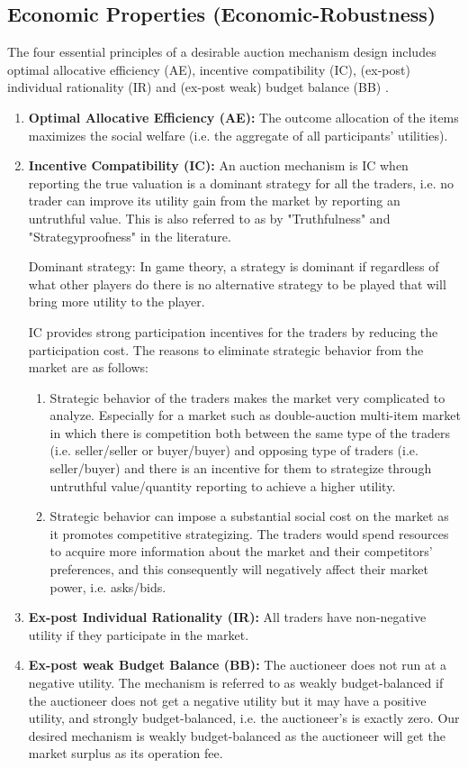 \subsection {Economic Properties (Economic-Robustness)}
\label{Method:subsec:Economic-Robustness}
The four essential principles of a desirable auction mechanism design includes optimal allocative efficiency (AE), incentive compatibility (IC), (ex-post) individual rationality (IR) and (ex-post weak) budget balance (BB) \cite{Krishna02}.

\begin{enumerate}
\item \textbf{Optimal Allocative Efficiency (AE):} The outcome allocation of the items maximizes the social welfare (i.e. the aggregate of all participants' utilities).
\item \textbf{Incentive Compatibility (IC):} An auction mechanism is IC when reporting the true valuation is a dominant strategy for all the traders, i.e. no trader can improve its utility gain from the market by reporting an untruthful value. This is also referred to as by "Truthfulness" and "Strategyproofness" in the literature.
\begin{Definition}
Dominant strategy: In game theory, a strategy is dominant if regardless of what other players do there is no alternative strategy to be played that will bring more utility to the player.
\end{Definition}
IC provides strong participation incentives for the traders by reducing the participation cost. The reasons to eliminate strategic behavior from the market are as follows:
\begin{enumerate}
\item Strategic behavior of the traders makes the market very complicated to analyze. Especially for a market such as double-auction multi-item market in which there is competition both between the same type of the traders (i.e. seller/seller or buyer/buyer) and opposing type of traders (i.e. seller/buyer) and there is an incentive for them to strategize through untruthful value/quantity reporting to achieve a higher utility.

\item Strategic behavior can impose a substantial social cost on the market as it promotes competitive strategizing. The traders would spend resources to acquire more information about the market and their competitors' preferences, and this consequently will negatively affect their market power, i.e. asks/bids.
\end{enumerate}
\item \textbf{Ex-post Individual Rationality (IR):} All traders have non-negative utility if they participate in the market.
\item \textbf{Ex-post weak Budget Balance (BB):} The auctioneer does not run at a negative utility. The mechanism is referred to as weakly budget-balanced if the auctioneer does not get a negative utility but it may have a positive utility, and strongly budget-balanced, i.e. the auctioneer's is exactly zero. Our desired mechanism is weakly budget-balanced as the auctioneer will get the market surplus as its operation fee.
\end{enumerate}
